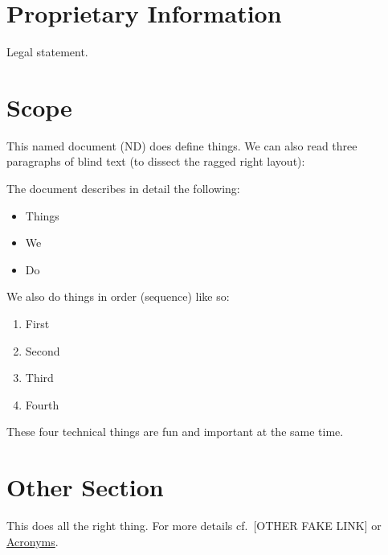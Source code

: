 \documentclass[english,paper=a4,captions=tableheading]{scrartcl}
\providecommand{\tightlist}{%
  \setlength{\itemsep}{0pt}\setlength{\parskip}{0pt}}
\begin{document}
\hypertarget{proprietary-information}{%
\section*{Proprietary Information}\label{proprietary-information}}

Legal statement.

\newpage
\renewcommand*\contentsname{Table of Contents}
{
\setcounter{tocdepth}{2}
\tableofcontents
}
\listoftables
\newpage
\listoffigures
\newpage

\hypertarget{scope}{%
\section{Scope}\label{scope}}

This named document (ND) does define things.
We can also read three paragraphs of blind text (to dissect the ragged right layout):

\lipsum[2-3][1-2]

\lipsum[3-9][4-8]

\lipsum[1-2][3-4]

The document describes in detail the following:

\begin{itemize}
\tightlist
\item
  Things
\item
  We
\item
  Do
\end{itemize}

We also do things in order (sequence) like so:

\begin{enumerate}
\def\labelenumi{\arabic{enumi}.}
\tightlist
\item
  First
\item
  Second
\item
  Third
\item
  Fourth
\end{enumerate}

These four technical things are fun and important at the same time.

\hypertarget{other-section}{%
\section{Other Section}\label{other-section}}

This does all the right thing. For more details cf.~{[}OTHER FAKE LINK{]}
or \hyperref[acronyms]{\color{some-blue}Acronyms}.
\end{document}
